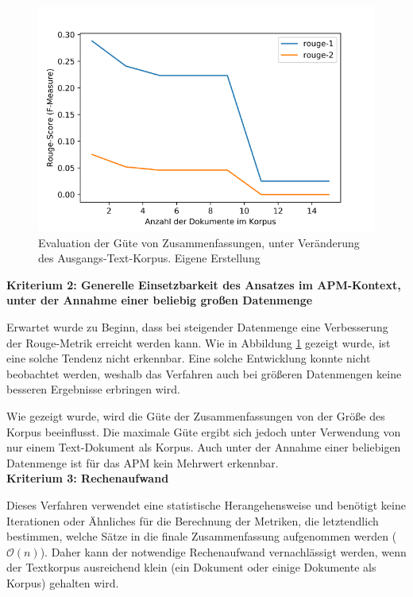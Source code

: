 \begin{figure}[h]
\centering
\includegraphics[scale=0.95]{content/pics/Picture_21.png}
\caption{Evaluation der Güte von Zusammenfassungen, unter Veränderung des Ausgangs-Text-Korpus. Eigene Erstellung}
\label{Abbildung:rouge-metrics}
\end{figure}

{\bf Kriterium 2: Generelle Einsetzbarkeit des Ansatzes im APM-Kontext, unter der Annahme einer beliebig großen Datenmenge}

Erwartet wurde zu Beginn, dass bei steigender Datenmenge eine Verbesserung der Rouge-Metrik erreicht werden kann. Wie in Abbildung \ref{Abbildung:rouge-metrics} gezeigt wurde, ist eine solche Tendenz nicht erkennbar.
Eine solche Entwicklung konnte nicht beobachtet werden, weshalb das Verfahren auch bei größeren Datenmengen keine besseren Ergebnisse erbringen wird. 

Wie gezeigt wurde, wird die Güte der Zusammenfassungen von der Größe des Korpus beeinflusst. Die maximale Güte ergibt sich jedoch unter Verwendung von nur einem Text-Dokument als Korpus. Auch unter der Annahme einer beliebigen Datenmenge ist für das APM kein Mehrwert erkennbar.
\\

{\bf Kriterium 3: Rechenaufwand}

Dieses Verfahren verwendet eine statistische Herangehensweise und benötigt keine Iterationen oder Ähnliches für die Berechnung der Metriken, die letztendlich bestimmen, welche Sätze in die finale Zusammenfassung aufgenommen werden ($\mathcal{O}(n)$). Daher kann der notwendige Rechenaufwand vernachlässigt werden, wenn der Textkorpus ausreichend klein (ein Dokument oder einige Dokumente als Korpus) gehalten wird.

